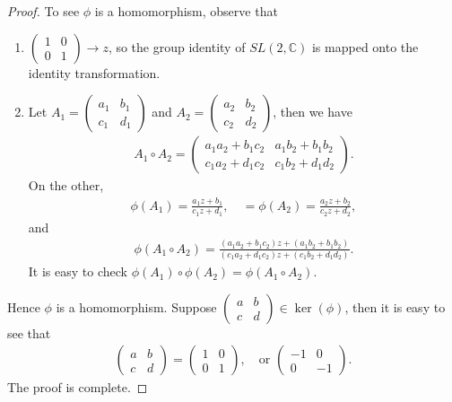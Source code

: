 \documentclass[11pt]{book}
\theoremstyle{definition}
\numberwithin{equation}{chapter}
\begin{document}
\begin{proof}
To see $\phi$ is a homomorphism, observe that
\begin{enumerate}[label=(\alph*)]
    \item $\begin{pmatrix} 1 & 0 \\ 0 & 1 \end{pmatrix} \to z$, so the group identity of $SL(2, \mathbb{C})$ is mapped onto the identity transformation.
    
    \item Let $A_1 = \begin{pmatrix}
        a_1 & b_1 \\
        c_1 & d_1
    \end{pmatrix}$ and $A_2 = \begin{pmatrix}
        a_2 & b_2 \\
        c_2 & d_2
    \end{pmatrix}$, then we have 
    \begin{align*}
        A_1 \circ A_2 = \begin{pmatrix}
        a_1a_2 + b_1c_2 & a_1b_2 + b_1b_2 \\
        c_1a_2 + d_1c_2 & c_1b_2 + d_1d_2
    \end{pmatrix}.
    \end{align*}
    On the other, 
    \begin{align*}
        \phi(A_1) = \frac{a_1 z + b_1}{c_1 z + d_1}, \quad = \phi(A_2) = \frac{a_2 z + b_2}{c_2 z + d_2},
    \end{align*}
    and 
    \begin{align*}
        \phi(A_1 \circ A_2) = \frac{(a_1a_2 + b_1c_2) z + (a_1b_2 + b_1b_2)}{(c_1a_2 + d_1c_2) z + (c_1b_2 + d_1d_2)}.
    \end{align*}
    It is easy to check $\phi(A_1) \circ \phi(A_2) = \phi(A_1 \circ A_2)$.
\end{enumerate}
Hence $\phi$ is a homomorphism. Suppose $\begin{pmatrix} a & b \\ c & d \end{pmatrix} \in \ker(\phi)$, then it is easy to see that 
\begin{align*}
    \begin{pmatrix}
        a & b \\
        c & d
    \end{pmatrix} = \begin{pmatrix} 1 & 0 \\ 0 & 1 \end{pmatrix}, \quad \text{or} \,\, \begin{pmatrix} -1 & 0 \\ 0 & -1 \end{pmatrix}.
\end{align*}
The proof is complete.
\end{proof}
\end{document}
